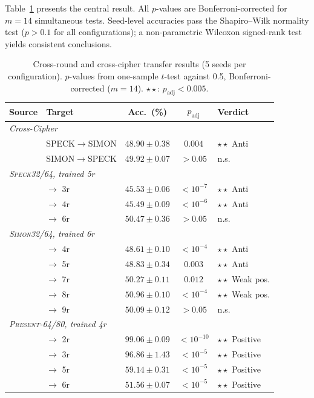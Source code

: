 \documentclass[runningheads]{llncs}
\newcommand{\speck}{\textsc{Speck32/64}\xspace}
\newcommand{\simon}{\textsc{Simon32/64}\xspace}
\newcommand{\present}{\textsc{Present-64/80}\xspace}
\begin{document}
Table~\ref{tab:transfer} presents the central result.
All $p$-values are Bonferroni-corrected for $m=14$ simultaneous tests.
Seed-level accuracies pass the Shapiro--Wilk normality test ($p > 0.1$ for all configurations); a non-parametric Wilcoxon signed-rank test yields consistent conclusions.

\begin{table}[t]
\centering
\caption{Cross-round and cross-cipher transfer results (5 seeds per configuration).
         $p$-values from one-sample $t$-test against 0.5, Bonferroni-corrected ($m{=}14$).
         $\star\star$: $p_{\text{adj}}<0.005$.}\label{tab:transfer}
\begin{tabular}{@{}llccl@{}}
\toprule
\textbf{Source} & \textbf{Target} & \textbf{Acc.\ (\%)} & \textbf{$p_{\text{adj}}$} & \textbf{Verdict} \\
\midrule
\multicolumn{5}{l}{\textit{Cross-Cipher}} \\
  & SPECK$\to$SIMON & $48.90 \pm 0.38$ & $0.004$       & $\star\star$ Anti \\
  & SIMON$\to$SPECK & $49.92 \pm 0.07$ & $> 0.05$      & n.s. \\
\midrule
\multicolumn{5}{l}{\textit{\speck, trained 5r}} \\
  & $\to$ 3r  & $45.53 \pm 0.06$ & $< 10^{-7}$  & $\star\star$ Anti \\
  & $\to$ 4r  & $45.49 \pm 0.09$ & $< 10^{-6}$  & $\star\star$ Anti \\
  & $\to$ 6r  & $50.47 \pm 0.36$ & $> 0.05$     & n.s. \\
\midrule
\multicolumn{5}{l}{\textit{\simon, trained 6r}} \\
  & $\to$ 4r  & $48.61 \pm 0.10$ & $< 10^{-4}$  & $\star\star$ Anti \\
  & $\to$ 5r  & $48.83 \pm 0.34$ & $0.003$       & $\star\star$ Anti \\
  & $\to$ 7r  & $50.27 \pm 0.11$ & $0.012$       & $\star\star$ Weak pos. \\
  & $\to$ 8r  & $50.96 \pm 0.10$ & $< 10^{-4}$  & $\star\star$ Weak pos. \\
  & $\to$ 9r  & $50.09 \pm 0.12$ & $> 0.05$      & n.s. \\
\midrule
\multicolumn{5}{l}{\textit{\present, trained 4r}} \\
  & $\to$ 2r  & $99.06 \pm 0.09$ & $< 10^{-10}$ & $\star\star$ Positive \\
  & $\to$ 3r  & $96.86 \pm 1.43$ & $< 10^{-5}$  & $\star\star$ Positive \\
  & $\to$ 5r  & $59.14 \pm 0.31$ & $< 10^{-5}$  & $\star\star$ Positive \\
  & $\to$ 6r  & $51.56 \pm 0.07$ & $< 10^{-5}$  & $\star\star$ Positive \\
\bottomrule
\end{tabular}
\end{table}
\end{document}
